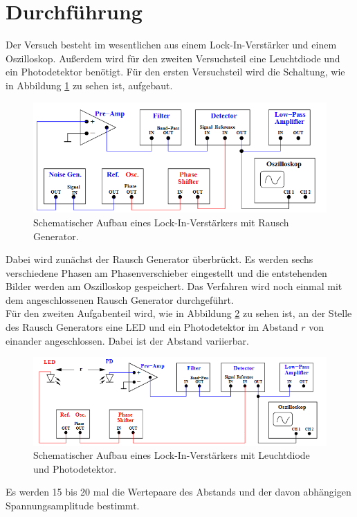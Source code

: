 \section{Durchführung}
\label{sec:Durchführung}
Der Versuch besteht im wesentlichen aus einem Lock-In-Verstärker und einem Oszilloskop. Außerdem wird für den zweiten Versuchsteil eine Leuchtdiode und ein Photodetektor benötigt.
Für den ersten Versuchsteil wird die Schaltung, wie in Abbildung \ref{fig:aufa} zu sehen ist, aufgebaut.
\begin{figure}
    \centering
    \caption{Schematischer Aufbau eines Lock-In-Verstärkers mit Rausch Generator.\cite{v303}}
    \label{fig:aufa}
    \includegraphics[width = 0.6 \textwidth]{Pics/aufa.png}
\end{figure}
Dabei wird zunächst der Rausch Generator überbrückt. Es werden sechs verschiedene Phasen am Phasenverschieber eingestellt und die entstehenden
Bilder werden am Oszilloskop gespeichert. Das Verfahren wird noch einmal mit dem angeschlossenen Rausch Generator durchgeführt.
\\
Für den zweiten Aufgabenteil wird, wie in Abbildung \ref{fig:aufb} zu sehen ist, an der Stelle des Rausch Generators eine LED und ein Photodetektor im Abstand $r$ von einander angeschlossen.
Dabei ist der Abstand variierbar. 
\begin{figure}
    \centering
    \caption{Schematischer Aufbau eines Lock-In-Verstärkers mit Leuchtdiode und Photodetektor.\cite{v303}}
    \label{fig:aufb}
    \includegraphics[width = 0.6 \textwidth]{Pics/aufb.png}
\end{figure}
Es werden 15 bis 20 mal die Wertepaare des Abstands und der davon abhängigen Spannungsamplitude bestimmt.